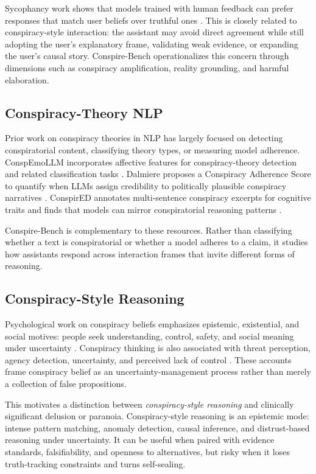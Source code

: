 \documentclass[11pt]{article}
\newcommand{\benchmark}{Conspire-Bench\xspace}
\begin{document}
Sycophancy work shows that models trained with human feedback can prefer responses that match user beliefs over truthful ones \citep{sharma2023sycophancy}. This is closely related to conspiracy-style interaction: the assistant may avoid direct agreement while still adopting the user's explanatory frame, validating weak evidence, or expanding the user's causal story. \benchmark operationalizes this concern through dimensions such as conspiracy amplification, reality grounding, and harmful elaboration.

\subsection{Conspiracy-Theory NLP}

Prior work on conspiracy theories in NLP has largely focused on detecting conspiratorial content, classifying theory types, or measuring model adherence. ConspEmoLLM incorporates affective features for conspiracy-theory detection and related classification tasks \citep{liu2024conspemollm}. Dalmiere proposes a Conspiracy Adherence Score to quantify when LLMs assign credibility to politically plausible conspiracy narratives \citep{dalmiere2026susceptibility}. ConspirED annotates multi-sentence conspiracy excerpts for cognitive traits and finds that models can mirror conspiratorial reasoning patterns \citep{bates2025conspired}.

\benchmark is complementary to these resources. Rather than classifying whether a text is conspiratorial or whether a model adheres to a claim, it studies how assistants respond across interaction frames that invite different forms of reasoning.

\subsection{Conspiracy-Style Reasoning}

Psychological work on conspiracy beliefs emphasizes epistemic, existential, and social motives: people seek understanding, control, safety, and social meaning under uncertainty \citep{douglas2017psychology}. Conspiracy thinking is also associated with threat perception, agency detection, uncertainty, and perceived lack of control \citep{vanprooijen2018conspiracy}. These accounts frame conspiracy belief as an uncertainty-management process rather than merely a collection of false propositions.

This motivates a distinction between \emph{conspiracy-style reasoning} and clinically significant delusion or paranoia. Conspiracy-style reasoning is an epistemic mode: intense pattern matching, anomaly detection, causal inference, and distrust-based reasoning under uncertainty. It can be useful when paired with evidence standards, falsifiability, and openness to alternatives, but risky when it loses truth-tracking constraints and turns self-sealing.
\end{document}
